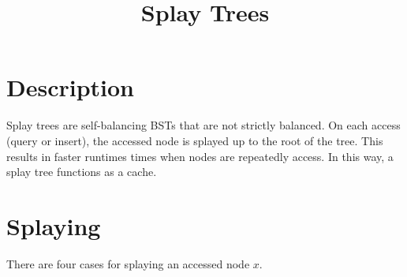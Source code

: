 \documentclass[12pt]{article}
\begin{document}
\title{Splay Trees}
\author{}
\maketitle

\section*{Description}
Splay trees are self-balancing BSTs that are not strictly balanced. On each access (query or insert), the accessed node is splayed up to the root of the tree. This results in faster runtimes times when nodes are repeatedly access. In this way, a splay tree functions as a cache.

\section*{Splaying}
There are four cases for splaying an accessed node $x$.
\end{document}
